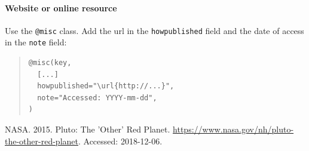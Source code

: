 \paragraph{Website or online resource} Use the \texttt{@misc} class. Add the url in the \texttt{howpublished} field and the date of access in the \texttt{note} field:
\begin{quote}
\begin{footnotesize}
\begin{verbatim}
@misc(key,
  [...]
  howpublished="\url{http://...}",
  note="Accessed: YYYY-mm-dd",
)
\end{verbatim}
\end{footnotesize}
\end{quote}
\nocite{c:23}
{NASA}. 2015.
\newblock Pluto: The 'Other' Red Planet.
\newblock \url{https://www.nasa.gov/nh/pluto-the-other-red-planet}.
\newblock Accessed: 2018-12-06.
